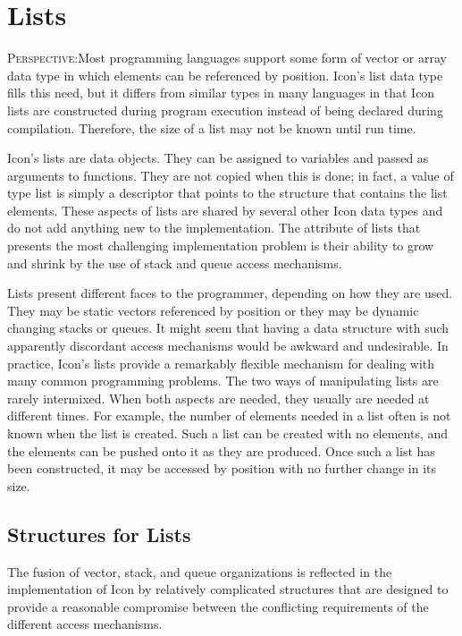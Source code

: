 \chapter{Lists}

\textsc{Perspective}:Most programming languages support some form of
vector or array data type in which elements can be referenced by
position. Icon's list data type fills this need, but it differs from
similar types in many languages in that Icon lists are constructed
during program execution instead of being declared during
compilation. Therefore, the size of a list may not be known until run
time.

Icon's lists are data objects. They can be assigned to variables and
passed as arguments to functions. They are not copied when this is
done; in fact, a value of type list is simply a descriptor that points
to the structure that contains the list elements. These aspects of
lists are shared by several other Icon data types and do not add
anything new to the implementation. The attribute of lists that
presents the most challenging implementation problem is their ability
to grow and shrink by the use of stack and queue access mechanisms.

Lists present different faces to the programmer, depending on how they
are used. They may be static vectors referenced by position or they
may be dynamic changing stacks or queues. It might seem that having a
data structure with such apparently discordant access mechanisms would
be awkward and undesirable. In practice, Icon's lists provide a
remarkably flexible mechanism for dealing with many common programming
problems. The two ways of manipulating lists are rarely
intermixed. When both aspects are needed, they usually are needed at
different times. For example, the number of elements needed in a list
often is not known when the list is created. Such a list can be
created with no elements, and the elements can be pushed onto it as
they are produced. Once such a list has been constructed, it may be
accessed by position with no further change in its size.

\section{Structures for Lists}

The fusion of vector, stack, and queue organizations is reflected in
the implementation of Icon by relatively complicated structures that
are designed to provide a reasonable compromise between the
conflicting requirements of the different access mechanisms.


